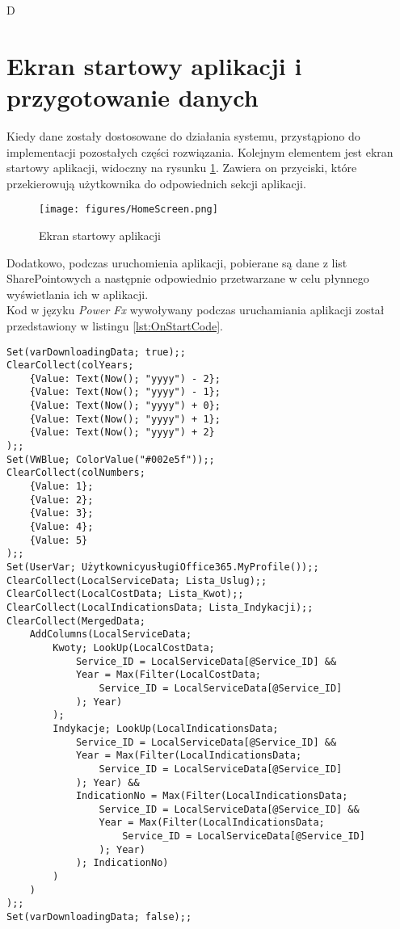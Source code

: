 D\section{Ekran startowy aplikacji i przygotowanie danych}
Kiedy dane zostały dostosowane do działania systemu, przystąpiono do implementacji pozostałych części rozwiązania.
Kolejnym elementem jest ekran startowy aplikacji, widoczny na rysunku \ref{fig:homescreen}. Zawiera on przyciski, które przekierowują użytkownika do odpowiednich sekcji aplikacji.

\begin{figure}[h]
    \centering
    \texttt{[image: figures/HomeScreen.png]}
    \caption{Ekran startowy aplikacji} 
    \label{fig:homescreen}
\end{figure}

Dodatkowo, podczas uruchomienia aplikacji, pobierane są dane z list SharePointowych a następnie odpowiednio przetwarzane w celu płynnego wyświetlania ich w aplikacji. \\
Kod w języku \emph{Power Fx} wywoływany podczas uruchamiania aplikacji został przedstawiony w listingu \ref{lst:OnStartCode}.

\begin{lstlisting}[language=PowerFx]
Set(varDownloadingData; true);;
ClearCollect(colYears; 
    {Value: Text(Now(); "yyyy") - 2}; 
    {Value: Text(Now(); "yyyy") - 1}; 
    {Value: Text(Now(); "yyyy") + 0}; 
    {Value: Text(Now(); "yyyy") + 1}; 
    {Value: Text(Now(); "yyyy") + 2}
);;
Set(VWBlue; ColorValue("#002e5f"));;
ClearCollect(colNumbers; 
    {Value: 1}; 
    {Value: 2}; 
    {Value: 3}; 
    {Value: 4}; 
    {Value: 5}
);;
Set(UserVar; UżytkownicyusługiOffice365.MyProfile());;
ClearCollect(LocalServiceData; Lista_Uslug);;
ClearCollect(LocalCostData; Lista_Kwot);;
ClearCollect(LocalIndicationsData; Lista_Indykacji);;
ClearCollect(MergedData; 
    AddColumns(LocalServiceData; 
        Kwoty; LookUp(LocalCostData; 
            Service_ID = LocalServiceData[@Service_ID] && 
            Year = Max(Filter(LocalCostData; 
                Service_ID = LocalServiceData[@Service_ID]
            ); Year)
        ); 
        Indykacje; LookUp(LocalIndicationsData; 
            Service_ID = LocalServiceData[@Service_ID] && 
            Year = Max(Filter(LocalIndicationsData; 
                Service_ID = LocalServiceData[@Service_ID]
            ); Year) && 
            IndicationNo = Max(Filter(LocalIndicationsData; 
                Service_ID = LocalServiceData[@Service_ID] && 
                Year = Max(Filter(LocalIndicationsData; 
                    Service_ID = LocalServiceData[@Service_ID]
                ); Year)
            ); IndicationNo)
        )
    )
);;
Set(varDownloadingData; false);;
\end{lstlisting}

